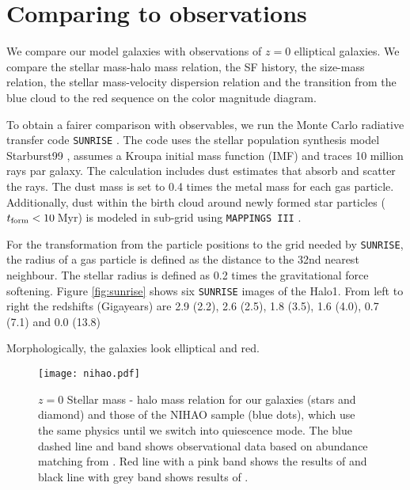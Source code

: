 \documentclass[useAMS,usenatbib]{mnras}
\begin{document}
\section{Comparing to observations}
\label{sec:obs}
We compare our model galaxies with observations of $z=0$ elliptical
galaxies. We compare the stellar mass-halo mass relation, the SF
history, the size-mass relation, the stellar mass-velocity dispersion
relation and the transition from the blue cloud to the red sequence on
the color magnitude diagram. {To obtain a fairer comparison
with observables, we run the Monte Carlo radiative transfer code \texttt{SUNRISE}
\citep[v5.0,][]{Jonsson2006}.
The code uses the stellar population
synthesis model Starburst99 \citep{Leitherer1999}, assumes a Kroupa
initial mass function (IMF) and traces 10 million rays par galaxy. The
calculation includes dust estimates that absorb and scatter the rays. The dust mass is set to 0.4 times the
metal mass for each gas particle. Additionally, dust within the birth cloud around newly formed star particles
($t_{\rm form} < 10$\,Myr) is modeled in sub-grid using
\texttt{MAPPINGS III} \citep{Groves2008}. 

For the transformation from the particle positions to
the grid needed by \texttt{SUNRISE}, the radius of a gas particle
is defined as the distance to the 32nd nearest neighbour. The stellar radius is defined
as 0.2 times the gravitational force softening.
%
Figure \ref{fig:sunrise} shows six \texttt{SUNRISE} images of the
Halo1. From left to right the redshifts (Gigayears) are 2.9 (2.2),
2.6 (2.5), 1.8 (3.5), 1.6 (4.0), 0.7 (7.1) and 0.0 (13.8)}
Morphologically, the galaxies look elliptical and red.
%
\begin{figure}
  \centering
 \texttt{[image: nihao.pdf]}
  \caption{$z=0$ Stellar mass - halo mass relation for our galaxies
    (stars and diamond) and those of the NIHAO sample (blue dots),
    which use the same physics until we switch into quiescence
    mode. The blue dashed line and band shows observational data based
    on abundance matching from \citet{Behroozi2013}. Red line with a
    pink band shows the results of \citet{Moster2013} and black line
    with grey band shows results of \citet{Kravtsov2014}.}
  \label{fig:nihao}
\end{figure}
\end{document}

